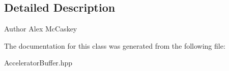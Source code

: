 \subsection{Detailed Description}
\begin{DoxyAuthor}{Author}
Alex Mc\+Caskey 
\end{DoxyAuthor}


The documentation for this class was generated from the following file\+:\begin{DoxyCompactItemize}
\item 
Accelerator\+Buffer.\+hpp\end{DoxyCompactItemize}
